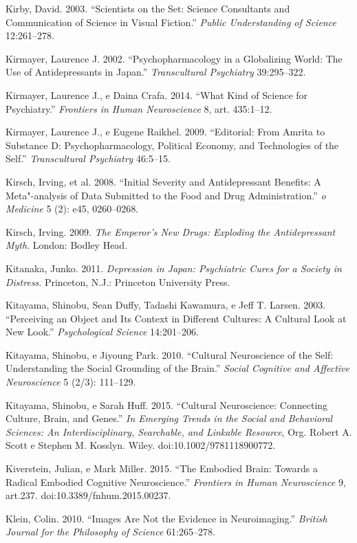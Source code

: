 {\begin{Parskip}
Kirby, David. 2003. ``Scientists on the Set: Science Consultants and
Communication of Science in Visual Fiction.'' \emph{Public Understanding
of Science} 12:261--278.

Kirmayer, Laurence J. 2002. ``Psychopharmacology in a Globalizing World:
The Use of Antidepressants in Japan.'' \emph{Transcultural Psychiatry}
39:295--322.

Kirmayer, Laurence J., e Daina Crafa. 2014. ``What Kind of Science for
Psychiatry.'' \emph{Frontiers in Human Neuroscience} 8, art. 435:1--12.

Kirmayer, Laurence J., e Eugene Raikhel. 2009. ``Editorial: From Amrita
to Substance D: Psychopharmacology, Political Economy, and Technologies
of the Self.'' \emph{Transcultural Psychiatry} 46:5--15.

Kirsch, Irving, et al. 2008. ``Initial Severity and Antidepressant
Benefits: A Meta"-analysis of Data Submitted to the Food and Drug
Administration.'' \emph{o} \emph{Medicine} 5 (2): e45, 0260--0268.

Kirsch, Irving. 2009. \emph{The Emperor's New Drugs: Exploding the
Antidepressant Myth}. London: Bodley Head.

Kitanaka, Junko. 2011. \emph{Depression in Japan: Psychiatric Cures for
a Society in Distress}. Princeton, N.J.: Princeton University Press.

Kitayama, Shinobu, Sean Duffy, Tadashi Kawamura, e Jeff T. Larsen. 2003.
``Perceiving an Object and Its Context in Different Cultures: A Cultural
Look at New Look.'' \emph{Psychological Science} 14:201--206.

Kitayama, Shinobu, e Jiyoung Park. 2010. ``Cultural Neuroscience of the
Self: Understanding the Social Grounding of the Brain.'' \emph{Social
Cognitive and Affective Neuroscience} 5 (2/3): 111--129.

Kitayama, Shinobu, e Sarah Huff. 2015. ``Cultural Neuroscience:
Connecting Culture, Brain, and Genes.'' \emph{In Emerging Trends in the
Social and Behavioral Sciences: An Interdisciplinary, Searchable, and
Linkable Resource}, Org. Robert A. Scott e Stephen M. Kosslyn. Wiley.
doi:10.1002/9781118900772.

Kiverstein, Julian, e Mark Miller. 2015. ``The Embodied Brain: Towards a
Radical Embodied Cognitive Neuroscience.'' \emph{Frontiers in Human
Neuroscience} 9, art.237. doi:10.3389/fnhum.2015.00237.

Klein, Colin. 2010. ``Images Are Not the Evidence in Neuroimaging.''
\emph{British Journal for the Philosophy of Science} 61:265--278.


\end{Parskip}}
